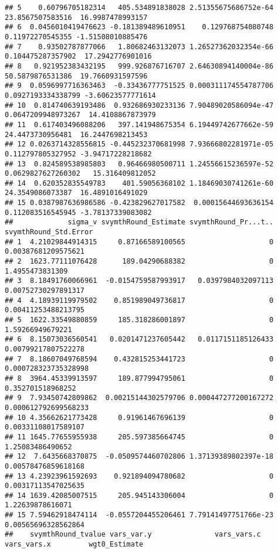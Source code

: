 \documentclass[
]{book}
\begin{document}
\begin{verbatim}
## 5    0.60796705182314   405.534891838028 2.51355675686752e-64   23.8567507583516  16.9987478993157
## 6  0.0456010419476623 -0.181389489610951    0.129768754080748   0.11972270545355 -1.51508010885476
## 7    0.93502787877066   1.80682463132073 1.26527362032354e-66  0.104475287357902  17.2942776901016
## 8   0.921952383432195   999.926876716707 2.64630894140004e-86   50.5879876531386  19.7660931597596
## 9  0.0596997716363463  -0.33436777751525 0.000311174554787706 0.0927193334338799 -3.60623577771614
## 10  0.814740639193486  0.932686930233136 7.90489020586094e-47 0.0647209948973267  14.4108867873979
## 11  0.617403496088206   397.141948675354 6.19449742677662e-59   24.4473730956481  16.2447698213453
## 12 0.0263714328556815 -0.445232370681998 7.93666802281971e-05  0.112797805327952 -3.94717228218682
## 13  0.824589538985803   0.96466980500711 1.24556615236597e-52 0.0629827627260302   15.316409812052
## 14  0.620352835549783    401.59056368102 1.18469030741261e-60   24.3549086073387  16.4891016491029
## 15 0.0387987636986586 -0.423829627017582  0.00015644693636154  0.112083516545945 -3.78137339083082
##             sigma_v svymthRound_Estimate svymthRound_Pr...t.. svymthRound_Std.Error
## 1  4.21029844914315     0.87166589100565                    0   0.00387681209575621
## 2  1623.77111076428      189.04290688382                    0       1.4955473831309
## 3  8.18491760066961  -0.0154759587993917   0.0397984032097113   0.00752730297891317
## 4  4.18939119979502    0.851989049736817                    0   0.00411253488213795
## 5  1622.33549880859     185.318286001897                    0      1.59266949679221
## 6  8.15073036560541   0.0201471237605442   0.0117151185126433   0.00799217807522278
## 7  8.18607049768594    0.432815253441723                    0  0.000728323735328998
## 8  3964.45339913597     189.877994795061                    0     0.352701518968252
## 9  7.93450742809862  0.00215144302579706 0.000447277200167272  0.000612792699568233
## 10 4.35662621773428     0.91961467696139                    0   0.00331108017589107
## 11 1645.77655955938     205.597385664745                    0      1.25083486490652
## 12  7.6435668370875  -0.0509574460702806 1.37139389802397e-18   0.00578476859618168
## 13 4.23923961592693    0.921894094780682                    0   0.00317113547025635
## 14 1639.42085007515     205.945143306004                    0      1.22639878616071
## 15 7.59462918474114  -0.0557204455206461 7.79141497751766e-23   0.00565696328562864
##    svymthRound_tvalue vars_var.y               vars_vars.c vars_vars.x         wgt0_Estimate

\end{verbatim}
\end{document}
